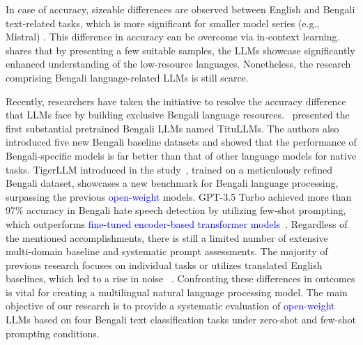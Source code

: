 \documentclass[10pt,letterpaper]{article}
\newcommand{\rev}[1]{\textcolor{blue}{#1}}
\begin{document}
In case of accuracy, sizeable differences are observed between English and Bengali text-related tasks, which is more significant for smaller model series (e.g., Mistral) \cite{b6}. This difference in accuracy can be overcome via in-context learning. \cite{b43} shares that by presenting a few suitable samples, the LLMs showcase significantly enhanced understanding of the low-resource languages. Nonetheless, the research comprising Bengali language-related LLMs is still scarce.

Recently, researchers have taken the initiative to resolve the accuracy difference that LLMs face by building exclusive Bengali language resources.~\cite{b21} presented the first substantial pretrained Bengali LLMs named TituLLMs. The authors also introduced five new Bengali baseline datasets and showed that the performance of Bengali-specific models is far better than that of other language models for native tasks. TigerLLM introduced in the study~\cite{b10}, trained on a meticulously refined Bengali dataset, showcases a new benchmark for Bengali language processing, surpassing the previous \rev{open-weight} models. GPT-3.5 Turbo achieved more than 97\% accuracy in Bengali hate speech detection by utilizing few-shot prompting, which outperforms \rev{fine-tuned encoder-based transformer models}~\cite{b22}. Regardless of the mentioned accomplishments, there is still a limited number of extensive multi-domain baseline and systematic prompt assessments. The majority of previous research focuses on individual tasks or utilizes translated English baselines, which led to a rise in noise ~\cite{b6,b28}. Confronting these differences in outcomes is vital for creating a multilingual natural language processing model. The main objective of our research is to provide a systematic evaluation of \rev{open-weight} LLMs based on four Bengali text classification tasks under zero-shot and few-shot prompting conditions.
\end{document}
